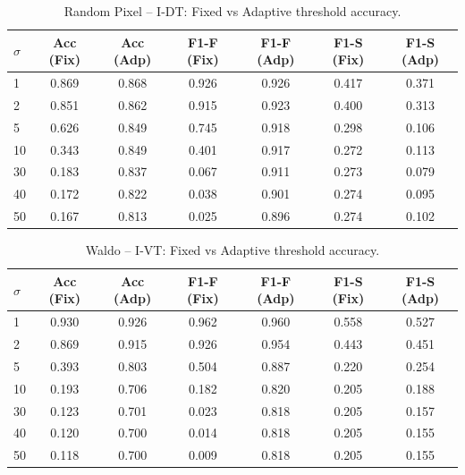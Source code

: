 \begin{table}[htb]
\centering
\caption{Random Pixel – I-DT: Fixed vs Adaptive threshold accuracy.}
\label{tab:random_pixel_idt}
\begin{tabular}{lcccccc}
\toprule
$\sigma$ & Acc (Fix) & Acc (Adp) & F1-F (Fix) & F1-F (Adp) & F1-S (Fix) & F1-S (Adp) \\
\midrule
1 & 0.869 & 0.868 & 0.926 & 0.926 & 0.417 & 0.371 \\
2 & 0.851 & 0.862 & 0.915 & 0.923 & 0.400 & 0.313 \\
5 & 0.626 & 0.849 & 0.745 & 0.918 & 0.298 & 0.106 \\
10 & 0.343 & 0.849 & 0.401 & 0.917 & 0.272 & 0.113 \\
30 & 0.183 & 0.837 & 0.067 & 0.911 & 0.273 & 0.079 \\
40 & 0.172 & 0.822 & 0.038 & 0.901 & 0.274 & 0.095 \\
50 & 0.167 & 0.813 & 0.025 & 0.896 & 0.274 & 0.102 \\
\bottomrule
\end{tabular}
\end{table}


\begin{table}[htb]
\centering
\caption{Waldo – I-VT: Fixed vs Adaptive threshold accuracy.}
\label{tab:waldo_ivt}
\begin{tabular}{lcccccc}
\toprule
$\sigma$ & Acc (Fix) & Acc (Adp) & F1-F (Fix) & F1-F (Adp) & F1-S (Fix) & F1-S (Adp) \\
\midrule
1 & 0.930 & 0.926 & 0.962 & 0.960 & 0.558 & 0.527 \\
2 & 0.869 & 0.915 & 0.926 & 0.954 & 0.443 & 0.451 \\
5 & 0.393 & 0.803 & 0.504 & 0.887 & 0.220 & 0.254 \\
10 & 0.193 & 0.706 & 0.182 & 0.820 & 0.205 & 0.188 \\
30 & 0.123 & 0.701 & 0.023 & 0.818 & 0.205 & 0.157 \\
40 & 0.120 & 0.700 & 0.014 & 0.818 & 0.205 & 0.155 \\
50 & 0.118 & 0.700 & 0.009 & 0.818 & 0.205 & 0.155 \\
\bottomrule
\end{tabular}
\end{table}


